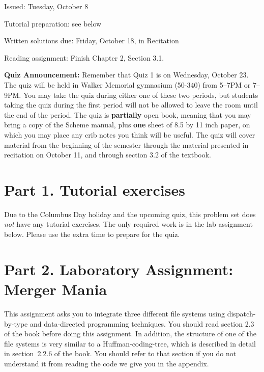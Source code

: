 


\def\fbox#1{%
  \vtop{\vbox{\hrule%
     \hbox{\vrule\kern3pt%
 \vtop{\vbox{\kern3pt#1}\kern3pt}%
 \kern3pt\vrule}}%
 \hrule}}




Issued: Tuesday, October 8

Tutorial preparation: see below

Written solutions due: Friday, October 18, in Recitation


Reading assignment: Finish Chapter 2, Section 3.1.

\bigskip

{\bf Quiz Announcement:}  Remember that Quiz 1 is on Wednesday, October
23.  The quiz 
will be held in Walker Memorial gymnasium (50-340) from 5--7PM or
7--9PM.  You may take the quiz during either one of these two periods,
but students taking the quiz during the first period will not be allowed
to leave the room until the end of the period.  The quiz is {\bf
partially} open book, meaning that you may bring a copy of the Scheme
manual, plus {\bf one} sheet of 8.5 by 11 inch paper, on which you may
place any crib notes you think will be useful.  The quiz will cover
material from the beginning of the semester through the material
presented in recitation on October 11, and through section 3.2
of the textbook.  

\section{Part 1. Tutorial exercises}

Due to the Columbus Day holiday and the upcoming quiz, this problem
set does {\em not} have any tutorial exercises.  The only required work is
in the lab assignment below. 
Please use the extra time to prepare for the quiz.


\section{Part 2. Laboratory Assignment: Merger Mania}

This assignment asks you to integrate three different file systems
using dispatch-by-type and data-directed programming techniques.
You should read section 2.3 of the book before doing this assignment.
In addition, the structure of one of the file systems is very
similar to a Huffman-coding-tree, which is described in detail in
section~2.2.6 of the book.  You should refer to that section if
you do not understand it from reading the code we give you in the
appendix.

